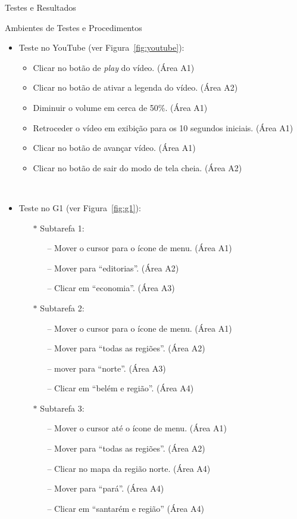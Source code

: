 \begin{chapter}{Testes e Resultados}
\begin{section}{Ambientes de Testes e Procedimentos}
\begin{itemize}
\item Teste no YouTube (ver Figura~\ref{fig:youtube}):
	\begin{itemize}
	\renewcommand\labelitemi{--}
	\item Clicar no botão de \textit{play} do vídeo.                   \hfill(Área A1)
	\item Clicar no botão de ativar a legenda do vídeo.                \hfill(Área A2)
	\item Diminuir o volume em cerca de 50\%.                          \hfill(Área A1)
	\item Retroceder o vídeo em exibição para os 10 segundos iniciais. \hfill(Área A1)
	\item Clicar no botão de avançar vídeo.                            \hfill(Área A1)
	\item Clicar no botão de sair do modo de tela cheia.               \hfill(Área A2)
	\end{itemize}
~
\break
\item Teste no G1 (ver Figura~\ref{fig:g1}):
	\begin{itemize}
	\item[$\ast$] Subtarefa 1:
		\begin{itemize}
		\item[--] Mover o cursor para o ícone de menu.        \hfill (Área A1)
		\item[--] Mover para ``editorias''.                   \hfill (Área A2)
		\item[--] Clicar em ``economia''.                     \hfill (Área A3)
		\end{itemize}
	\item[$\ast$] Subtarefa 2:
		\begin{itemize}
		\item[--] Mover o cursor para o ícone de menu.        \hfill (Área A1)
		\item[--] Mover para ``todas as regiões''.            \hfill (Área A2)
		\item[--] mover para ``norte''.                       \hfill (Área A3)
		\item[--] Clicar em ``belém e região''.               \hfill (Área A4)
		\end{itemize}
	\item[$\ast$] Subtarefa 3:
		\begin{itemize}
		\item[--] Mover o cursor até o ícone de menu.         \hfill(Área A1)
		\item[--] Mover para ``todas as regiões''.            \hfill(Área A2)
		\item[--] Clicar no mapa da região norte.             \hfill(Área A4)
		\item[--] Mover para ``pará''.                        \hfill(Área A4)
		\item[--] Clicar em ``santarém e região''             \hfill(Área A4)
		\end{itemize}
	\end{itemize}
\end{itemize}


\end{section}
\end{chapter}
